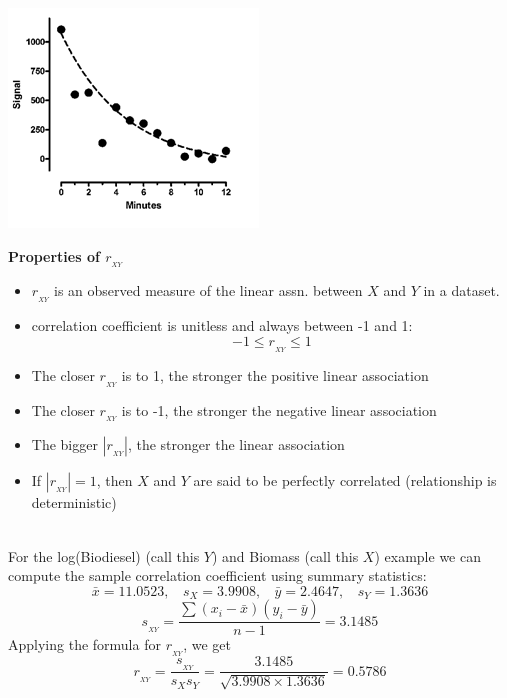 \begin{flushright}
\includegraphics{scatternonlinear}
\end{flushright}

\newpage

\textbf{Properties of $r_{_{XY}}$}
\begin{itemize}
\item $r_{_{XY}}$ is an observed measure of the linear assn. between $X$ and $Y$ in a dataset.
\item correlation coefficient is unitless and always between -1 and 1:
$$ -1 \leq r_{_{XY}} \leq 1 $$
\item The closer $r_{_{XY}}$ is to 1, the stronger the positive linear association
\item The closer $r_{_{XY}}$ is to -1, the stronger the negative linear association
\item The bigger $|r_{_{XY}}|$, the stronger the linear association 
\item If $|r_{_{XY}}|=1$, then $X$ and $Y$ are said to be perfectly correlated (relationship is deterministic)
\end{itemize}
~\\
For the log(Biodiesel) (call this $Y$) and Biomass (call this $X$) example we can compute the sample correlation coefficient using summary statistics: \label{bio}
$$ \bar{x}=11.0523, ~~~~ s_X=3.9908, ~~~~\bar{y}=2.4647, ~~~~ s_Y = 1.3636$$ 
$$ s_{_{XY}}=\frac{\sum(x_i-\bar{x})(y_i-\bar{y})}{n-1} = 3.1485$$
Applying the formula for $r_{_{XY}}$, we get
$$ r_{_{XY}}=\frac{s_{_{XY}}}{s_X s_Y}=\frac{3.1485}{\sqrt{3.9908 \times 1.3636}} =0.5786$$

